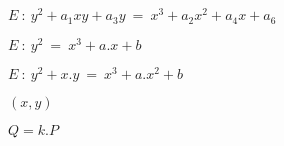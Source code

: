 \documentclass{article}
\begin{document}
$ E ~:~ y^{2} + a_{1}xy + a_{3}y ~=~ x^{3} + a_{2}x^{2} + a_{4}x + a_{6} $
\pagebreak

$ E ~:~ y^{2}~=~x^3+a.x+b $
\pagebreak

$ E ~:~ y^{2} + x.y ~=~x^3+ a.x^2 + b $
\pagebreak

$ (x, y) $
\pagebreak

$ Q = k.P $
\pagebreak
\end{document}
